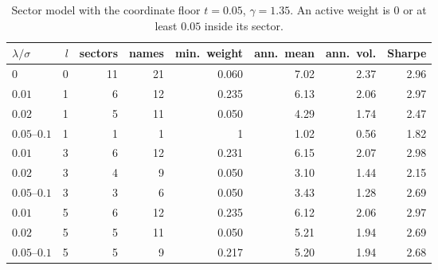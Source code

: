 \documentclass[11pt,a4paper]{article}
\theoremstyle{plain}
\theoremstyle{definition}
\theoremstyle{remark}
\begin{document}
\begin{table}[ht]
  \centering
  \setlength{\belowcaptionskip}{10pt}
  \caption{Sector model with the coordinate floor \(t=0.05\), \(\gamma=1.35\).
    An active weight is \(0\) or at least \(0.05\) inside its sector.
  }
  \label{tab:sector-t05}
  \small
  \begin{tabular}{@{}lrrrrrrr@{}}
    \toprule
    \(\lambda/\sigma\) & \(l\) & sectors & names & min.\ weight & ann.\ mean & ann.\ vol. & Sharpe \\
    \midrule
    \(0\)              & \(0\) & 11      & 21    & 0.060        & 7.02       & 2.37       & 2.96   \\
    \(0.01\)           & 1     & 6       & 12    & 0.235        & 6.13       & 2.06       & 2.97   \\
    \(0.02\)           & 1     & 5       & 11    & 0.050        & 4.29       & 1.74       & 2.47   \\
    \(0.05\)--\(0.1\)  & 1     & 1       & 1     & 1            & 1.02       & 0.56       & 1.82   \\
    \(0.01\)           & 3     & 6       & 12    & 0.231        & 6.15       & 2.07       & 2.98   \\
    \(0.02\)           & 3     & 4       & 9     & 0.050        & 3.10       & 1.44       & 2.15   \\
    \(0.05\)--\(0.1\)  & 3     & 3       & 6     & 0.050        & 3.43       & 1.28       & 2.69   \\
    \(0.01\)           & 5     & 6       & 12    & 0.235        & 6.12       & 2.06       & 2.97   \\
    \(0.02\)           & 5     & 5       & 11    & 0.050        & 5.21       & 1.94       & 2.69   \\
    \(0.05\)--\(0.1\)  & 5     & 5       & 9     & 0.217        & 5.20       & 1.94       & 2.68   \\
    \bottomrule
  \end{tabular}
\end{table}
\end{document}
